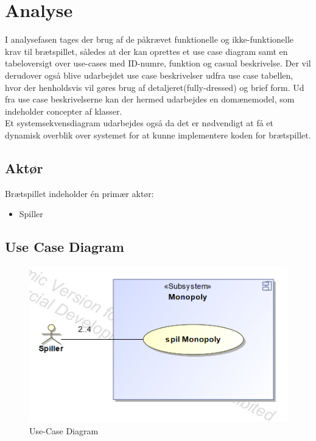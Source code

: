 \documentclass[../main.tex]{subfiles}
\begin{document}
\section{Analyse}

\begin{flushleft} 
I analysefasen tages der brug af de påkrævet funktionelle og ikke-funktionelle krav til brætspillet, således at der kan oprettes et use case diagram samt en tabeloversigt over use-cases med ID-numre, funktion og casual beskrivelse. 
Der vil derudover også blive udarbejdet use case beskrivelser udfra use case tabellen, hvor der henholdsvis vil gøres brug af detaljeret(fully-dressed) og brief form.
Ud fra use case beskrivelserne kan der hermed udarbejdes en domænemodel, som indeholder concepter af klasser.\\
Et systemsekvensdiagram udarbejdes også da det er nødvendigt at få et dynamisk overblik over systemet for at kunne implementere koden for brætspillet.
\end{flushleft}


\subsection{Aktør}
Brætspillet indeholder én primær aktør:
\begin{itemize}
  \item  Spiller
\end{itemize}


\subsection{Use Case Diagram}
\begin{figure}[H]
    \centering
    \includegraphics[width=0.6\linewidth]{figures/use-case_Diagram.png}
    \caption{Use-Case Diagram}
    \label{fig:UCDia}
\end{figure}

\newpage 

\end{document}
